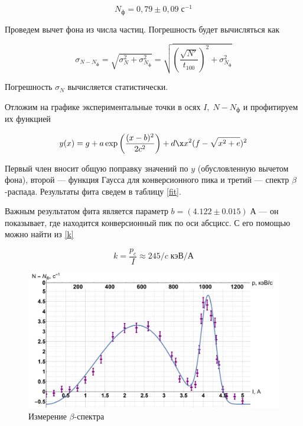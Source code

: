 \documentclass[12pt]{kiarticle} %
\newcommand{\be}{\ensuremath{\beta}}
\begin{document}
\begin{equation}\label{}
N_ф = 0,79 \pm 0,09 \; с^{-1}
\end{equation}

Проведем вычет фона из числа частиц. Погрешность будет вычисляться как

\begin{equation}\label{}
\sigma_{N - N_ф} = \sqrt{\sigma_N^2 + \sigma_{N_ф}^2} = \sqrt{\left( \dfrac{\sqrt{N'}}{t_{100}} \right) ^2 + \sigma_{N_ф}^2} 
\end{equation}  

Погрешность $ \sigma_N $ вычисляется статистически. 

Отложим на графике экспериментальные точки в осях $ I, \; N-N_ф $ и профитируем их функцией 

\begin{equation}\label{}
y(x) = g + a \exp\left( \dfrac{(x - b)^2}{2c^2} \right) + d\x x^2(f - \sqrt{x^2 + e})^2
\end{equation}

Первый член вносит общую поправку значений по $ y $ (обусловленную вычетом фона), второй --- функция Гаусса для конверсионного пика и третий --- спектр \be-распада. Результаты фита сведем в таблицу \ref{fit}.

Важным результатом фита является параметр $ b = (4.122 \pm 0.015) \; А $ --- он показывает, где находится конверсионный пик по оси абсцисс. С его помощью можно найти из \eqref{k} 

\begin{equation}\label{}
k = \dfrac{p_c}{I} \approx 245/c \; кэВ / А
\end{equation}

	\begin{figure}[H]
	\label{graf_4}
	\includegraphics[scale=0.47]{grafp.pdf}
	\caption{Измерение \be-спектра}
\end{figure}
\end{document}
